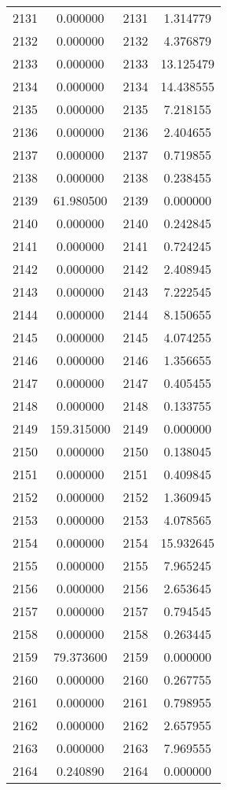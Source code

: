 \documentclass[12pt]{article}
\begin{document}
\begin{longtable}{@{}cccc@{}}
2131 & 0.000000 & 2131 & 1.314779 \\
2132 & 0.000000 & 2132 & 4.376879 \\
2133 & 0.000000 & 2133 & 13.125479 \\
2134 & 0.000000 & 2134 & 14.438555 \\
2135 & 0.000000 & 2135 & 7.218155 \\
2136 & 0.000000 & 2136 & 2.404655 \\
2137 & 0.000000 & 2137 & 0.719855 \\
2138 & 0.000000 & 2138 & 0.238455 \\
2139 & 61.980500 & 2139 & 0.000000 \\
2140 & 0.000000 & 2140 & 0.242845 \\
2141 & 0.000000 & 2141 & 0.724245 \\
2142 & 0.000000 & 2142 & 2.408945 \\
2143 & 0.000000 & 2143 & 7.222545 \\
2144 & 0.000000 & 2144 & 8.150655 \\
2145 & 0.000000 & 2145 & 4.074255 \\
2146 & 0.000000 & 2146 & 1.356655 \\
2147 & 0.000000 & 2147 & 0.405455 \\
2148 & 0.000000 & 2148 & 0.133755 \\
2149 & 159.315000 & 2149 & 0.000000 \\
2150 & 0.000000 & 2150 & 0.138045 \\
2151 & 0.000000 & 2151 & 0.409845 \\
2152 & 0.000000 & 2152 & 1.360945 \\
2153 & 0.000000 & 2153 & 4.078565 \\
2154 & 0.000000 & 2154 & 15.932645 \\
2155 & 0.000000 & 2155 & 7.965245 \\
2156 & 0.000000 & 2156 & 2.653645 \\
2157 & 0.000000 & 2157 & 0.794545 \\
2158 & 0.000000 & 2158 & 0.263445 \\
2159 & 79.373600 & 2159 & 0.000000 \\
2160 & 0.000000 & 2160 & 0.267755 \\
2161 & 0.000000 & 2161 & 0.798955 \\
2162 & 0.000000 & 2162 & 2.657955 \\
2163 & 0.000000 & 2163 & 7.969555 \\
2164 & 0.240890 & 2164 & 0.000000 \\

\end{longtable}
\end{document}
